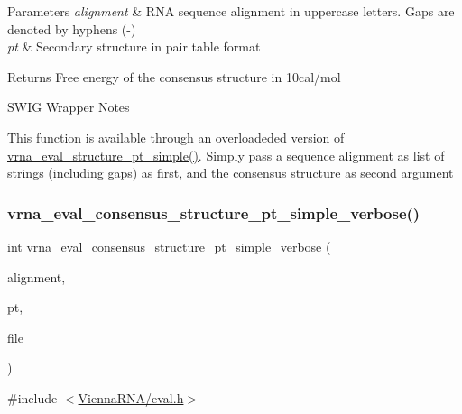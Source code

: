 \begin{DoxyParams}{Parameters}
{\em alignment} & R\+NA sequence alignment in uppercase letters. Gaps are denoted by hyphens (\textquotesingle{}-\/\textquotesingle{}) \\
\hline
{\em pt} & Secondary structure in pair table format \\
\hline
\end{DoxyParams}
\begin{DoxyReturn}{Returns}
Free energy of the consensus structure in 10cal/mol
\end{DoxyReturn}
\begin{DoxyRefDesc}{S\+W\+I\+G Wrapper Notes}
\item[\mbox{\hyperlink{wrappers__wrappers000054}{S\+W\+I\+G Wrapper Notes}}]This function is available through an overloadeded version of \mbox{\hyperlink{group__eval_ga0bba59b4d6e53461088666ff4aece7b0}{vrna\+\_\+eval\+\_\+structure\+\_\+pt\+\_\+simple()}}. Simply pass a sequence alignment as list of strings (including gaps) as first, and the consensus structure as second argument \end{DoxyRefDesc}
\mbox{\label{group__eval_ga2769e4369d023ad2d5c5f4d2ee825c23}} 
\subsubsection{\texorpdfstring{vrna\+\_\+eval\+\_\+consensus\+\_\+structure\+\_\+pt\+\_\+simple\+\_\+verbose()}{vrna\_eval\_consensus\_structure\_pt\_simple\_verbose()}}
{\footnotesize\ttfamily int vrna\+\_\+eval\+\_\+consensus\+\_\+structure\+\_\+pt\+\_\+simple\+\_\+verbose (\begin{DoxyParamCaption}\item[{const char $\ast$$\ast$}]{alignment,  }\item[{const short $\ast$}]{pt,  }\item[{F\+I\+LE $\ast$}]{file }\end{DoxyParamCaption})}



{\ttfamily \#include $<$\mbox{\hyperlink{eval_8h}{Vienna\+R\+N\+A/eval.\+h}}$>$}

